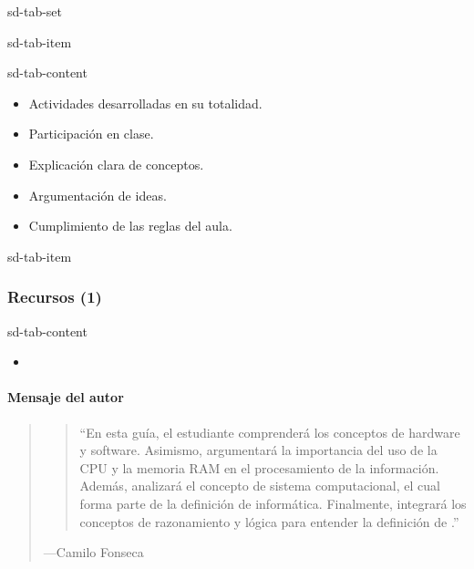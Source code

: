 \documentclass[letterpaper,10pt,spanish]{sphinxmanual}
\begin{document}
\begin{sphinxuseclass}{sd-tab-set}
\begin{sphinxuseclass}{sd-tab-item}
\begin{sphinxuseclass}{sd-tab-content}\begin{itemize}
\item {} 
\sphinxAtStartPar
Actividades desarrolladas en su totalidad.

\item {} 
\sphinxAtStartPar
Participación en clase.

\item {} 
\sphinxAtStartPar
Explicación clara de conceptos.

\item {} 
\sphinxAtStartPar
Argumentación de ideas.

\item {} 
\sphinxAtStartPar
Cumplimiento de las reglas del aula.

\end{itemize}

\end{sphinxuseclass}
\end{sphinxuseclass}
\begin{sphinxuseclass}{sd-tab-item}\subsubsection*{Recursos (1)}

\begin{sphinxuseclass}{sd-tab-content}\begin{itemize}
\item {} 
\sphinxAtStartPar
{\hyperref[\detokenize{cursos/logica8/recursos/T01::doc}]{}}

\end{itemize}

\end{sphinxuseclass}
\end{sphinxuseclass}
\end{sphinxuseclass}

\paragraph{Mensaje del autor}
\label{\detokenize{cursos/logica8/periodo01/G01:mensaje-del-autor}}\begin{quote}
\begin{quote}

\sphinxAtStartPar
“En esta guía, el estudiante comprenderá los conceptos de hardware y software. Asimismo, argumentará la importancia del uso de la CPU y la memoria RAM en el procesamiento de la información. Además, analizará el concepto de sistema computacional, el cual forma parte de la definición de informática. Finalmente, integrará los conceptos de razonamiento y lógica para entender la definición de .”
\end{quote}

\begin{flushright}
---Camilo Fonseca
\end{flushright}
\end{quote}
\end{document}
